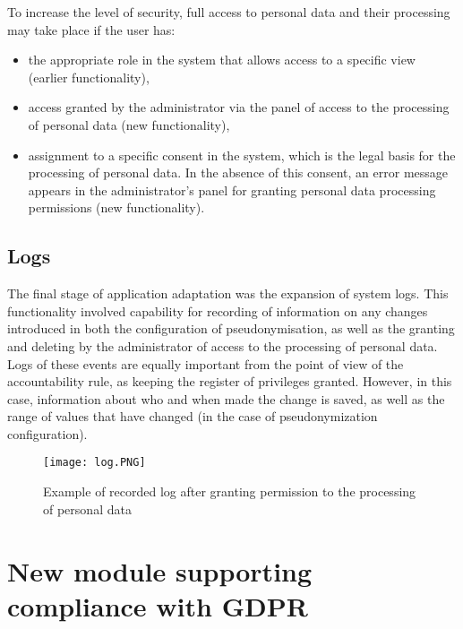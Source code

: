 \documentclass[en, noamssymb]{mgr}
\begin{document}
To increase the level of security, full access to personal data and their processing may take place if the user has:

\begin{itemize}

\item the appropriate role in the system that allows access to a specific view (earlier functionality),
\item access granted by the administrator via the panel of access to the processing of personal data (new functionality),
\item assignment to a specific consent in the system, which is the legal basis for the processing of personal data. In the absence of this consent, an error message appears in the administrator's panel for granting personal data processing permissions (new functionality).

\end{itemize}


\subsection{Logs}

The final stage of application adaptation was the expansion of system logs. This functionality involved capability for recording of information on any changes introduced in both the configuration of pseudonymisation, as well as the granting and deleting by the administrator of access to the processing of personal data. Logs of these events are equally important from the point of view of the accountability rule, as keeping the register of privileges granted. However, in this case, information about who and when made the change is saved, as well as the range of values that have changed (in the case of pseudonymization configuration). 

\begin{figure}[H]
	\centering
	\texttt{[image: log.PNG]}
	\caption[Example of recorded log after granting permission to the processing of personal data]{Example of recorded log after granting permission to the processing of personal data}
	\label{fig:Logs}
\end{figure}

\section{New module supporting compliance with GDPR}
 
\end{document}
